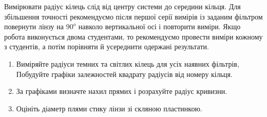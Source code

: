 Вимірювати радіус кілець слід від центру системи до середини кільця.
Для збільшення точності рекомендуємо після першої серії вимірів із заданим
фільтром повернути лінзу на $90^{o}$ навколо вертикальної осі і повторити виміри.
Якщо робота виконується двома студентами, то рекомендуємо провести виміри
кожному з студентів, а потім порівняти й усереднити одержані результати.

\begin{enumerate}
    \item Виміряйте радіуси темних та світлих кілець для усіх наявних фільтрів,
    Побудуйте графіки залежностей квадрату радіусів від номеру кільця.
    
    \item За графіками визначте нахил прямих і розрахуйте радіус кривизни.

    \item Оцініть діаметр плями стику лінзи зі скляною пластинкою.
\end{enumerate}